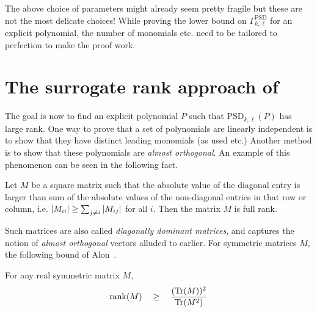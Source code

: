 The above choice of parameters might already seem pretty fragile but these are not the most delicate choices! 
While proving the lower bound on $\Gamma^{\mathrm{PSD}}_{k,\ell}$ for an explicit polynomial, the number of monomials etc. need to be tailored to perfection to make the proof work. 

\section{The surrogate rank approach of \cite{KLSS}}

The goal is now to find an explicit polynomial $P$ such that $\mathrm{PSD}_{k,\ell}(P)$ has large rank. 
One way to prove that a set of polynomials are linearly independent is to show that they have distinct leading monomials (as used \cite{gkks13} etc.) Another method is to show that these polynomials are \emph{almost orthogonal}. 
An example of this phenomenon can be seen in the following fact. 

\begin{fact}
Let $M$ be a square matrix such that the absolute value of the diagonal entry is larger than sum of the absolute values of the non-diagonal entries in that row or column, i.e. $\left|M_{ii}\right| \geq \sum_{j\neq i} \left|M_{ij}\right|$ for all $i$. 
Then the matrix $M$ is full rank. 
\end{fact}

Such matrices are also called \emph{diagonally dominant matrices}, and captures the notion of \emph{almost orthogonal} vectors alluded to earlier. 
For symmetric matrices $M$, the following bound of Alon~\cite{Alo09}.

\begin{lemma}\label{lem:trace-bound} For any real symmetric matrix $M$, 
\[
\operatorname{rank}(M) \quad \geq \quad \frac{(\mathrm{Tr}(M))^2}{\mathrm{Tr}(M^2)}
\]
\end{lemma}

